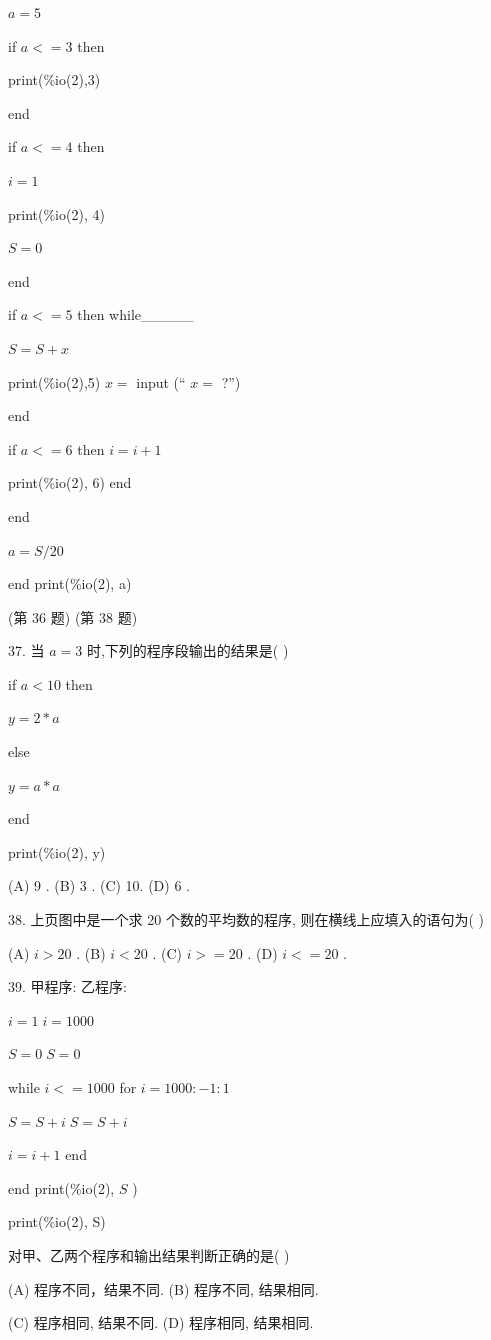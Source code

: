\documentclass[10pt]{article}
\begin{document}
\(a = 5\)

if \(a <  = 3\) then

print(\%io(2),3)

end

if \(a <  = 4\) then

\(i = 1\)

print(\%io(2), 4)

\(S = 0\)

end

if \(a <  = 5\) then while\_\_\_\_\_

\(S = S + x\)

print(\%io(2),5) \(x =\) input (“ \(x =\) ?”)

end

if \(a <  = 6\) then \(i = i + 1\)

print(\%io(2), 6) end

end

\(a = S/{20}\)

end print(\%io(2), a)

(第 36 题) (第 38 题)

37. 当 \(a = 3\) 时,下列的程序段输出的结果是( )

if \(a < {10}\) then

\(y = 2 * a\)

else

\(y = a * a\)

end

print(\%io(2), y)

(A) 9 . (B) 3 . (C) 10. (D) 6 .

38. 上页图中是一个求 20 个数的平均数的程序, 则在横线上应填入的语句为( )

(A) \(i > {20}\) . (B) \(i < {20}\) . (C) \(i >  = {20}\) . (D) \(i <  = {20}\) .

39. 甲程序: 乙程序:

\(i = 1 \; i = {1000}\)

\(S = 0 \; S = 0\)

while \(i <  = {1000}\) for \(i = {1000} :  - 1 : 1\)

\(S = S + i \; S = S + i\)

\(i = i + 1\) end

end print(\%io(2), \(S\) )

print(\%io(2), S)

对甲、乙两个程序和输出结果判断正确的是( )

(A) 程序不同，结果不同. (B) 程序不同, 结果相同.

(C) 程序相同, 结果不同. (D) 程序相同, 结果相同.
\end{document}
